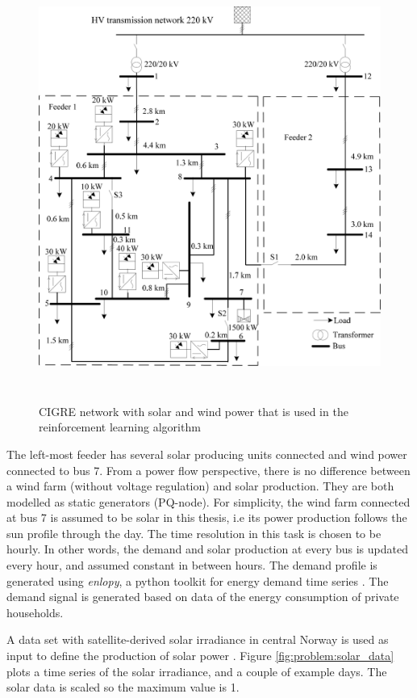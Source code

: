 \documentclass[class=book, crop=false]{standalone}
\begin{document}
\begin{figure}[ht]
    \center
    \includegraphics[height=14cm, width=13.5cm]{figures/cigre_network_mv_der.png}
    \caption[size = 9]{CIGRE network with solar and wind power that is used in the reinforcement learning algorithm \cite{cigre}}
    \label{fig:problem:cigre_network}
\end{figure}


The left-most feeder has several solar producing units connected and wind power connected to bus 7. From a power flow perspective, there is no difference between a wind farm (without voltage regulation) and solar production. They are both modelled as static generators (PQ-node). For simplicity, the wind farm connected at bus 7 is assumed to be solar in this thesis, i.e its power production follows the sun profile through the day. The time resolution in this task is chosen to be hourly. In other words, the demand and solar production at every bus is updated every hour, and assumed constant in between hours. The demand profile is generated using \textit{enlopy}, a python toolkit for energy demand time series \cite{enlopy}. The demand signal is generated based on data of the energy consumption of private households.

A data set with satellite-derived solar irradiance in central Norway is used as input to define the production of solar power \cite{solar_data}. Figure \ref{fig:problem:solar_data} plots a time series of the solar irradiance, and a couple of example days. The solar data is scaled so the maximum value is 1.
\end{document}
